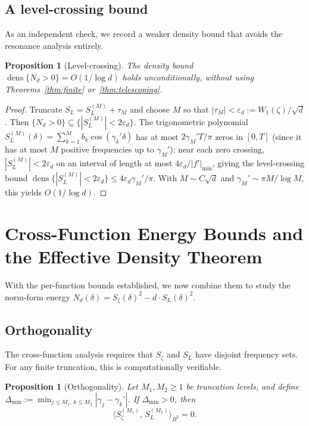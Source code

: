 \documentclass[12pt,reqno]{amsart}
\theoremstyle{plain}
\newtheorem{proposition}[theorem]{Proposition}
\theoremstyle{definition}
\theoremstyle{remark}
\DeclareMathOperator{\dens}{dens}
\begin{document}
\subsection{A level-crossing bound}

As an independent check, we record a weaker density bound that avoids the resonance analysis entirely.

\begin{proposition}[Level-crossing]\label{prop:logd}
The density bound $\dens\{N_d > 0\} = O(1/\log d)$ holds unconditionally, without using Theorems~\ref{thm:finite} or~\ref{thm:telescoping}.
\end{proposition}

\begin{proof}
Truncate $S_L = S_L^{(M)} + \tau_M$ and choose $M$ so that $|\tau_M| < \varepsilon_d := W_1(\zeta)/\sqrt{d}$.  Then $\{N_d > 0\} \subseteq \{|S_L^{(M)}| < 2\varepsilon_d\}$.  The trigonometric polynomial $S_L^{(M)}(\delta) = \sum_{k=1}^M b_k\cos(\gamma_k'\delta)$ has at most $2\gamma_M'T/\pi$ zeros in $[0,T]$ (since it has at most $M$ positive frequencies up to $\gamma_M'$); near each zero crossing, $|S_L^{(M)}| < 2\varepsilon_d$ on an interval of length at most $4\varepsilon_d/|f'|_{\min}$, giving the level-crossing bound $\dens\{|S_L^{(M)}| < 2\varepsilon_d\} \leq 4\varepsilon_d\gamma_M'/\pi$.  With $M \sim C\sqrt{d}$ and $\gamma_M' \sim \pi M/\log M$, this yields $O(1/\log d)$.
\end{proof}

\section{Cross-Function Energy Bounds and the Effective Density Theorem}\label{sec:compare}

With the per-function bounds established, we now combine them to study the norm-form energy $N_d(\delta) = S_\zeta(\delta)^2 - d\cdot S_L(\delta)^2$.


\subsection{Orthogonality}

The cross-function analysis requires that $S_\zeta$ and $S_L$ have disjoint frequency sets.  For any finite truncation, this is computationally verifiable.

\begin{proposition}[Orthogonality]\label{prop:orthog}
Let $M_1, M_2 \geq 1$ be truncation levels, and define $\Delta_{\min} := \min_{j \leq M_1,\, k \leq M_2} |\gamma_j - \gamma_k'|$.  If $\Delta_{\min} > 0$, then
\begin{equation}\label{eq:uncorrelated}
  \langle S_\zeta^{(M_1)},\, S_L^{(M_2)}\rangle_{B^2} = 0.
\end{equation}
\end{proposition}
\end{document}
